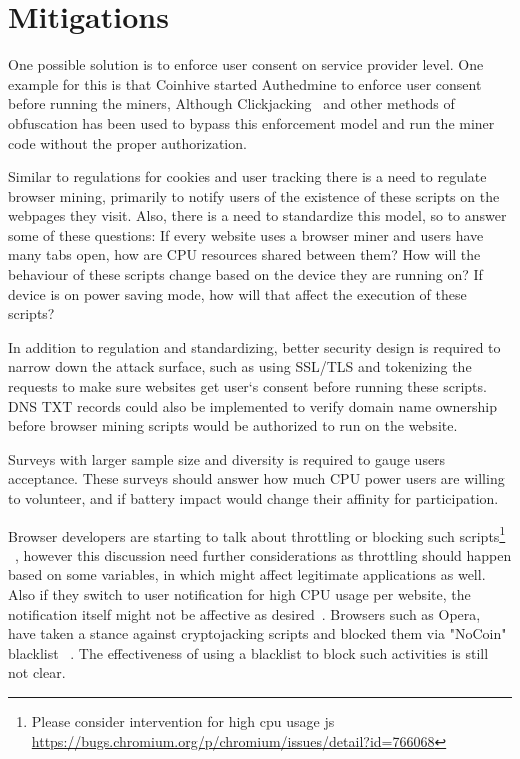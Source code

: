 


\section{Mitigations}

One possible solution is to enforce user consent on service provider level. One example for this is that Coinhive started Authedmine to enforce user consent before running the miners, Although Clickjacking~\cite{rydstedt2010busting} and other methods of obfuscation has been used to bypass this enforcement model and run the miner code without the proper authorization.

Similar to regulations for cookies and user tracking there is a need to regulate browser mining, primarily to notify users of the existence of these scripts on the webpages they visit. Also, there is a need to standardize this model, so to answer some of these questions: If every website uses a browser miner and users have many tabs open, how are CPU resources shared between them? How will the behaviour of these scripts change based on the device they are running on? If device is on power saving mode, how will that affect the execution of these scripts?

In addition to regulation and standardizing, better security design is required to narrow down the attack surface, such as using SSL/TLS and tokenizing the requests to make sure websites get user`s consent before running these scripts. DNS TXT records could also be implemented to verify domain name ownership before browser mining scripts would be authorized to run on the website.

Surveys with larger sample size and diversity is required to gauge users acceptance. These surveys should answer how much CPU power users are willing to volunteer, and if battery impact would change their affinity for participation.

Browser developers are starting to talk about throttling or blocking such scripts\footnote{Please consider intervention for high cpu usage js \url{https://bugs.chromium.org/p/chromium/issues/detail?id=766068}}  ~\cite{operanocoin}, however this discussion need further considerations as throttling should happen based on some variables, in which might affect legitimate applications as well. Also if they switch to user notification for high CPU usage per website, the notification itself might not be affective as desired~\cite{SHB11}\cite{SEAAC09}.
Browsers such as Opera, have taken a stance against cryptojacking scripts and blocked them via "NoCoin" blacklist ~\cite{operanocoin}. The effectiveness of using a blacklist to block such activities is still not clear. %


